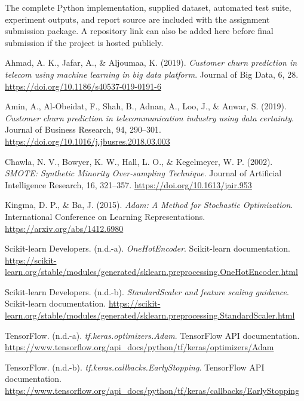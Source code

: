 \documentclass[11pt]{article}
\begin{document}
The complete Python implementation, supplied dataset, automated test suite, experiment outputs, and report source are included with the assignment submission package. A repository link can also be added here before final submission if the project is hosted publicly.

\begin{thebibliography}{}

Ahmad, A. K., Jafar, A., \& Aljoumaa, K. (2019).
\textit{Customer churn prediction in telecom using machine learning in big data platform}.
Journal of Big Data, 6, 28.
\url{https://doi.org/10.1186/s40537-019-0191-6}

Amin, A., Al-Obeidat, F., Shah, B., Adnan, A., Loo, J., \& Anwar, S. (2019).
\textit{Customer churn prediction in telecommunication industry using data certainty}.
Journal of Business Research, 94, 290--301.
\url{https://doi.org/10.1016/j.jbusres.2018.03.003}

Chawla, N. V., Bowyer, K. W., Hall, L. O., \& Kegelmeyer, W. P. (2002).
\textit{SMOTE: Synthetic Minority Over-sampling Technique}.
Journal of Artificial Intelligence Research, 16, 321--357.
\url{https://doi.org/10.1613/jair.953}

Kingma, D. P., \& Ba, J. (2015).
\textit{Adam: A Method for Stochastic Optimization}.
International Conference on Learning Representations.
\url{https://arxiv.org/abs/1412.6980}

Scikit-learn Developers. (n.d.-a).
\textit{OneHotEncoder}.
Scikit-learn documentation.
\url{https://scikit-learn.org/stable/modules/generated/sklearn.preprocessing.OneHotEncoder.html}

Scikit-learn Developers. (n.d.-b).
\textit{StandardScaler and feature scaling guidance}.
Scikit-learn documentation.
\url{https://scikit-learn.org/stable/modules/generated/sklearn.preprocessing.StandardScaler.html}

TensorFlow. (n.d.-a).
\textit{tf.keras.optimizers.Adam}.
TensorFlow API documentation.
\url{https://www.tensorflow.org/api_docs/python/tf/keras/optimizers/Adam}

TensorFlow. (n.d.-b).
\textit{tf.keras.callbacks.EarlyStopping}.
TensorFlow API documentation.
\url{https://www.tensorflow.org/api_docs/python/tf/keras/callbacks/EarlyStopping}


\end{thebibliography}
\end{document}
